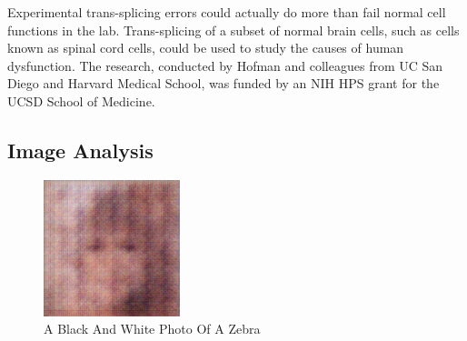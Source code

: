 \documentclass{article}%
\begin{document}
Experimental trans{-}splicing errors could actually do more than fail normal cell functions in the lab. Trans{-}splicing of a subset of normal brain cells, such as cells known as spinal cord cells, could be used to study the causes of human dysfunction.\newline%
The research, conducted by Hofman and colleagues from UC San Diego and Harvard Medical School, was funded by an NIH HPS grant for the UCSD School of Medicine.

%
\subsection{Image Analysis}%
\label{subsec:ImageAnalysis}%


\begin{figure}[h!]%
\centering%
\includegraphics[width=150px]{500_fake_images/samples_5_259.png}%
\caption{A Black And White Photo Of A Zebra}%
\end{figure}

%
\end{document}
